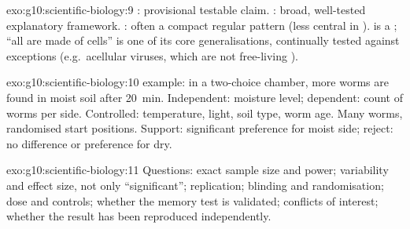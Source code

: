 \begin{solution}{exo:g10:scientific-biology:9}
: provisional testable claim. : broad, well-tested
explanatory framework. : often a compact regular pattern (less central
in ).  is a ; ``all  are made of cells''
is one of its core generalisations, continually tested against exceptions
(e.g.\ acellular viruses, which are not free-living ).
\end{solution}

\begin{solution}{exo:g10:scientific-biology:10}
 example: in a two-choice chamber, more worms are found in moist
soil after \qty{20}{min}. Independent: moisture level; dependent: count
of worms per side. Controlled: temperature, light, soil type, worm age.
Many worms, randomised start positions. Support: significant preference
for moist side; reject: no difference or preference for dry.
\end{solution}

\begin{solution}{exo:g10:scientific-biology:11}
Questions: exact sample size and power; variability and effect size, not
only ``significant''; replication; blinding and randomisation; dose and
controls; whether the memory test is validated; conflicts of interest;
whether the result has been reproduced independently.
\end{solution}

